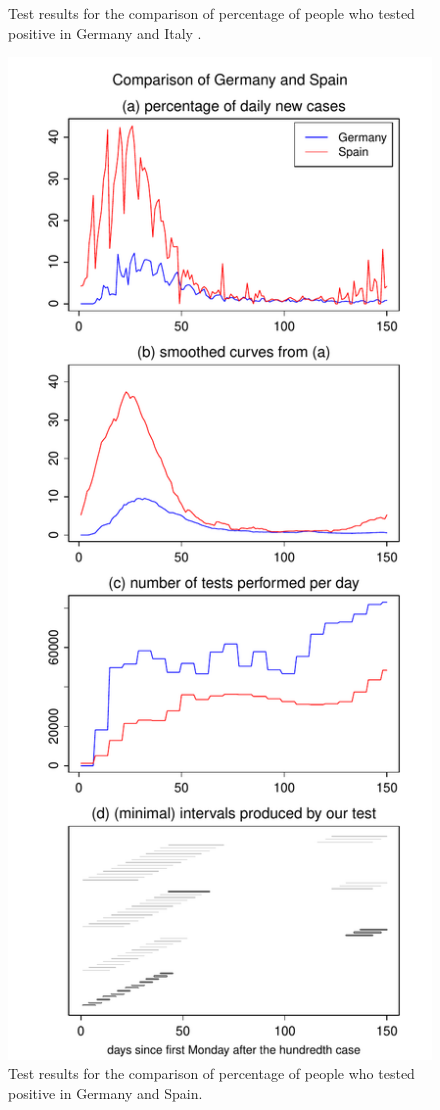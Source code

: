 \documentclass[a4paper,12pt]{article}
\numberwithin{equation}{section}
\begin{document}
\begin{figure}[h!]
\begin{minipage}[t]{0.49\textwidth}
\caption{Test results for the comparison of percentage of people who tested positive in Germany and Italy .}\label{fig:supp4:first}
\end{minipage}
\hspace{0.25cm}
\begin{minipage}[t]{0.49\textwidth}
\includegraphics[width=\textwidth]{plots/DEU_vs_ESP_normalised}
\caption{Test results for the comparison of percentage of people who tested positive in Germany and Spain.}
\end{minipage}
\end{figure}
\end{document}
